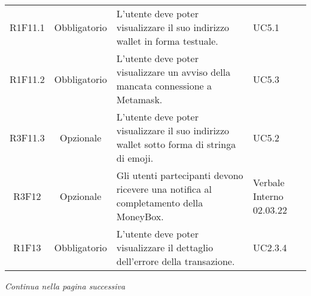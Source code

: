 \begin{table}[H]
\begin{tabular}{c | c | p{6cm} | p{4.1cm}}
        R1F11.1                                                           & Obbligatorio & L'utente deve poter visualizzare il suo indirizzo wallet in forma testuale.                                & UC5.1                    \\
        R1F11.2                                                           & Obbligatorio & L'utente deve poter visualizzare un avviso della mancata connessione a Metamask\glo{}.                           & UC5.3                    \\
        R3F11.3                                                           & Opzionale    & L'utente deve poter visualizzare il suo indirizzo wallet sotto forma di stringa di emoji.                  & UC5.2                    \\
        R3F12                                                             & Opzionale    & Gli utenti partecipanti devono ricevere una notifica al completamento della MoneyBox\glo{}.                & Verbale Interno 02.03.22 \\
        R1F13                                                             & Obbligatorio & L'utente deve poter visualizzare il dettaglio dell'errore della transazione.                               & UC2.3.4                  \\
    \end{tabular}
\end{table}
\begin{center}
    \textit{\small Continua nella pagina successiva}
\end{center}
